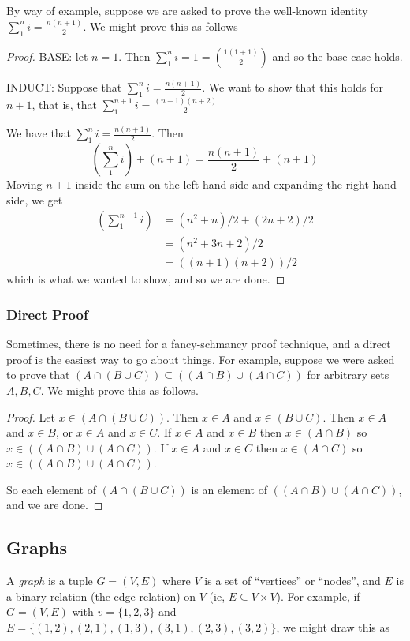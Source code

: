 By way of example, suppose we are asked to prove the well-known identity $\sum_1^ni = \frac{n(n+1)}{2}$. We might prove this as follows

\begin{proof}
BASE: let $n = 1$. Then $\sum_1^ni = 1 = (\frac{1(1+1)}{2})$ and so the base case holds. 

INDUCT: Suppose that $\sum_1^ni = \frac{n(n+1)}{2}$. We want to show that this holds for $n + 1$, that is, that $\sum_1^{n + 1}i = \frac{(n + 1)(n+2)}{2}$

We have that $\sum_1^ni = \frac{n(n+1)}{2}$. Then 
\[
  (\sum_1^ni) + (n + 1)= \frac{n(n+1)}{2} + (n + 1)
\]
Moving $n + 1$ inside the sum on the left hand side and expanding the right hand side, we get
\begin{align*}
(\sum_1^{n + 1}i) &= (n^2 + n)/2 + (2n + 2)/2 \\
&= (n^2 + 3n + 2)/2 \\
&= ((n+1)(n+2))/2
\end{align*}
which is what we wanted to show, and so we are done. 
\end{proof}

\subsubsection*{Direct Proof} Sometimes, there is no need for a fancy-schmancy proof technique, and a direct proof is the easiest way to go about things. For example, suppose we were asked to prove that $(A \cap (B \cup C)) \subseteq ((A \cap B) \cup (A \cap C))$ for arbitrary sets $A, B, C$. We might prove this as follows. 

\begin{proof}
Let $x \in (A \cap (B \cup C))$. Then $x \in A$ and $x \in (B \cup C)$. Then $x \in A$ and $x \in B$, or $x \in A$ and $x \in C$. If $x \in A$ and $x \in B$ then $x \in (A \cap B)$ so $x \in ((A \cap B) \cup (A \cap C))$. If $x \in A$ and $x \in C$ then $x \in (A \cap C)$ so $x \in ((A \cap B) \cup (A \cap C))$. 

So each element of $(A \cap (B \cup C))$ is an element of $((A \cap B) \cup (A \cap C))$, and we are done. 
\end{proof}

\subsection{Graphs}
A \emph{graph} is a tuple $G = (V, E)$ where $V$ is a set of ``vertices'' or ``nodes'', and $E$ is a binary relation (the edge relation) on $V$ (ie, $E \subseteq V \times V$). For example, if $G = (V, E)$ with $v = \{1, 2, 3\}$ and $E = \{(1, 2), (2, 1), (1, 3), (3, 1), (2, 3), (3, 2)\}$, we might draw this as


